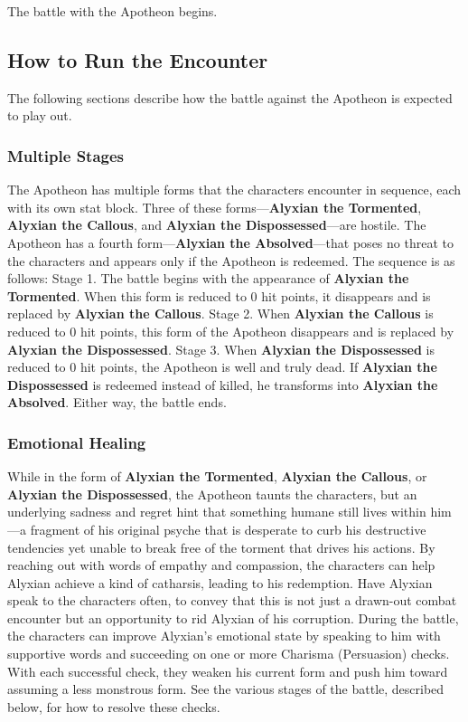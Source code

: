 \documentclass[10pt,a4,twoside,twocolumn,openany,nodeprecatedcode]{dndbook}
\begin{document}
The battle with the Apotheon begins.
\subsection{How to Run the Encounter}
The following sections describe how the battle against the Apotheon is expected to play out.
\subsubsection{Multiple Stages}
The Apotheon has multiple forms that the characters encounter in sequence, each with its own stat block. Three of these forms—\textbf{Alyxian the Tormented}, \textbf{Alyxian the Callous}, and \textbf{Alyxian the Dispossessed}—are hostile. The Apotheon has a fourth form—\textbf{Alyxian the Absolved}—that poses no threat to the characters and appears only if the Apotheon is redeemed. The sequence is as follows:
Stage 1. The battle begins with the appearance of \textbf{Alyxian the Tormented}. When this form is reduced to 0 hit points, it disappears and is replaced by \textbf{Alyxian the Callous}.
Stage 2. When \textbf{Alyxian the Callous} is reduced to 0 hit points, this form of the Apotheon disappears and is replaced by \textbf{Alyxian the Dispossessed}.
Stage 3. When \textbf{Alyxian the Dispossessed} is reduced to 0 hit points, the Apotheon is well and truly dead. If \textbf{Alyxian the Dispossessed} is redeemed instead of killed, he transforms into \textbf{Alyxian the Absolved}. Either way, the battle ends.
\subsubsection{Emotional Healing}
While in the form of \textbf{Alyxian the Tormented}, \textbf{Alyxian the Callous}, or \textbf{Alyxian the Dispossessed}, the Apotheon taunts the characters, but an underlying sadness and regret hint that something humane still lives within him—a fragment of his original psyche that is desperate to curb his destructive tendencies yet unable to break free of the torment that drives his actions. By reaching out with words of empathy and compassion, the characters can help Alyxian achieve a kind of catharsis, leading to his redemption.
Have Alyxian speak to the characters often, to convey that this is not just a drawn-out combat encounter but an opportunity to rid Alyxian of his corruption. During the battle, the characters can improve Alyxian's emotional state by speaking to him with supportive words and succeeding on one or more Charisma (Persuasion) checks. With each successful check, they weaken his current form and push him toward assuming a less monstrous form. See the various stages of the battle, described below, for how to resolve these checks.
\end{document}
